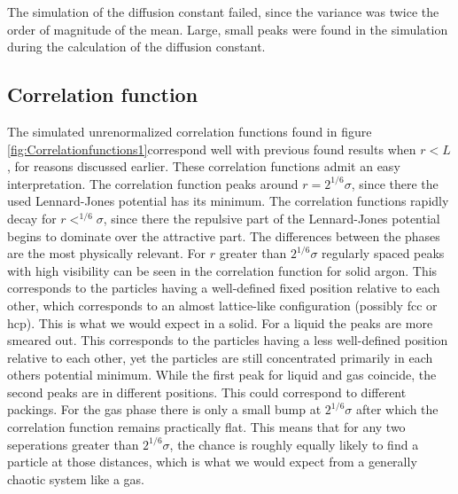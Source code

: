 The simulation of the diffusion constant failed, since the variance was twice the order of magnitude of the mean. Large, small peaks were found in the simulation during the calculation of the diffusion constant. 


\subsection{Correlation function}

The simulated unrenormalized correlation functions found in figure \ref{fig:Correlationfunctions1}correspond well with previous found results \cite{PhysRev.136.A405}\cite{yoon1981radial}\cite{franchetti1975radial}\cite{jos} when $r<L$, for reasons discussed earlier. These correlation functions admit an easy interpretation. The correlation function peaks around $r = 2^{1/6} \sigma$, since there the used Lennard-Jones potential has its minimum. The correlation functions rapidly decay for $r<^{1/6} \sigma$, since there the repulsive part of the Lennard-Jones potential begins to dominate over the attractive part. The differences between the phases are the most physically relevant. For $r$ greater than $2^{1/6}\sigma$ regularly spaced peaks with high visibility can be seen in the correlation function for solid argon. This corresponds to the particles having a well-defined fixed position relative to each other, which corresponds to an almost lattice-like configuration (possibly fcc or hcp\cite{van1991can}). This is what we would expect in a solid. For a liquid the peaks are more smeared out. This corresponds to the particles having a less well-defined position relative to each other, yet the particles are still concentrated primarily in each others potential minimum. While the first peak for liquid and gas coincide, the second peaks are in different positions. This could correspond to different packings. For the gas phase there is only a small bump at $2^{1/6}\sigma$ after which the correlation function remains practically flat. This means that for any two seperations greater than $2^{1/6}\sigma$, the chance is roughly equally likely to find a particle at those distances, which is what we would expect from a generally chaotic system like a gas.








